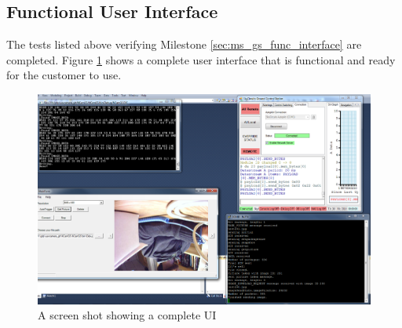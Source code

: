 \subsection{Functional User Interface}
\label{func_UI}
The tests listed above verifying Milestone \ref{sec:ms_gs_func_interface} are completed. Figure \ref{completeGUI} shows a complete user interface that is functional and ready for the customer to use.
\begin{figure}[H]
\begin{center}
\includegraphics[width=1.00\textwidth]{testing_screenshots/complete_testing_3.png} 
\end{center}
\caption{A screen shot showing a complete UI\label{completeGUI}}
\end{figure}



